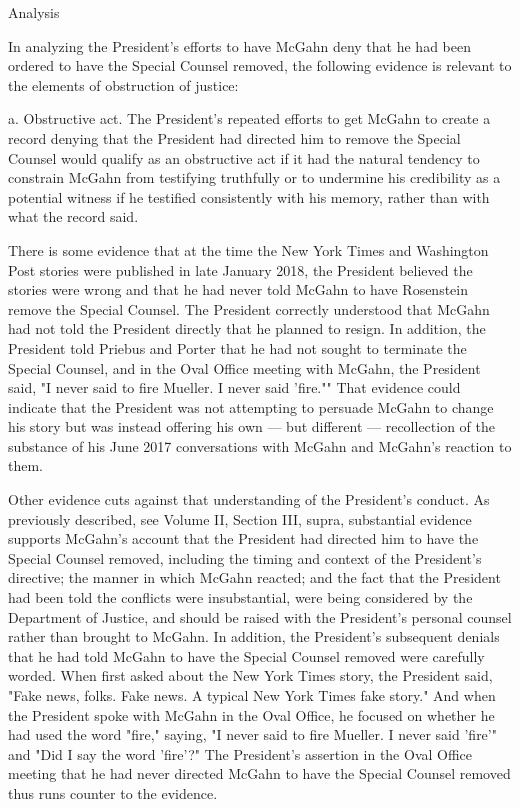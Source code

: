 Analysis

In analyzing the President's efforts to have McGahn deny that he had been ordered to have the Special Counsel removed, the following evidence is relevant to the elements of obstruction of justice:

a. Obstructive act.
The President's repeated efforts to get McGahn to create a record denying that the President had directed him to remove the Special Counsel would qualify as an obstructive act if it had the natural tendency to constrain McGahn from testifying truthfully or to undermine his credibility as a potential witness if he testified consistently with his memory, rather than with what the record said.

There is some evidence that at the time the New York Times and Washington Post stories were published in late January 2018, the President believed the stories were wrong and that he had never told McGahn to have Rosenstein remove the Special Counsel.
The President correctly understood that McGahn had not told the President directly that he planned to resign.
In addition, the President told Priebus and Porter that he had not sought to terminate the Special Counsel, and in the Oval Office meeting with McGahn, the President said, "I never said to fire Mueller.
I never said 'fire.""
That evidence could indicate that the President was not attempting to persuade McGahn to change his story but was instead offering his own — but different — recollection of the substance of his June 2017 conversations with McGahn and McGahn's reaction to them.

Other evidence cuts against that understanding of the President's conduct.
As previously described, see Volume II, Section III, supra, substantial evidence supports McGahn's account that the President had directed him to have the Special Counsel removed, including the timing and context of the President's directive;
the manner in which McGahn reacted;
and the fact that the President had been told the conflicts were insubstantial, were being considered by the Department of Justice, and should be raised with the President's personal counsel rather than brought to McGahn.
In addition, the President's subsequent denials that he had told McGahn to have the Special Counsel removed were carefully worded.
When first asked about the New York Times story, the President said, "Fake news, folks.
Fake news.
A typical New York Times fake story." And when the President spoke with McGahn in the Oval Office, he focused on whether he had used the word "fire," saying, "I never said to fire Mueller.
I never said 'fire'" and "Did I say the word 'fire'?" The President's assertion in the Oval Office meeting that he had never directed McGahn to have the Special Counsel removed thus runs counter to the evidence.

